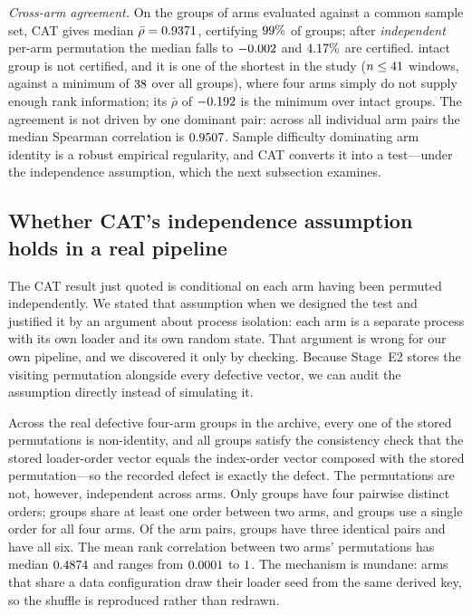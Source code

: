 \documentclass[a4paper,fleqn]{cas-sc}
\begin{document}
\emph{Cross-arm agreement.} On the \NumCatBlocks{} groups of arms evaluated against
a common sample set, CAT gives median $\bar{\rho} = 0.9371{}$,
certifying $99\%$ of groups; after \emph{independent} per-arm
permutation
the median falls to $-0.002{}$ and $4.17\%$ are
certified. \NumCatMissGroups{} intact group is not certified, and it is one of the
shortest in the study ($n \le 41{}$ windows, against a minimum of
$38{}$ over all groups), where four arms simply do not supply enough rank
information; its $\bar{\rho}$ of $-0.192{}$ is the minimum over intact
groups. The agreement is not driven by one dominant pair: across all \NumCatPairs{}
individual arm pairs the median Spearman correlation is $0.9507{}$.
Sample difficulty dominating arm identity is a robust empirical regularity, and CAT
converts it into a test---under the independence assumption, which the next
subsection examines.

\subsection{Whether CAT's independence assumption holds in a real pipeline}
\label{sec:res-observed}

The CAT result just quoted is conditional on each arm having been permuted
independently. We stated that assumption when we designed the test and justified
it by an argument about process isolation: each arm is a separate process with its
own loader and its own random state. That argument is wrong for our own pipeline,
and we discovered it only by checking. Because Stage~E2 stores the visiting
permutation alongside every defective vector, we can audit the assumption directly
instead of simulating it.

Across the \NumObsPermGroups{} real defective four-arm groups in the archive, every
one of the \NumObsPermArms{} stored permutations is non-identity, and all
\NumObsPermConsistentGroups{} groups satisfy the consistency check that the stored
loader-order vector equals the index-order vector composed with the stored
permutation---so the recorded defect is exactly the defect. The permutations are
not, however, independent across arms. Only \NumObsPermAllDistinct{} groups have
four pairwise distinct orders; \NumObsPermPartialShared{} groups share at least one
order between two arms, and \NumObsPermAllIdentical{} groups use a single order for
all four arms. Of the \NumObsPermPairs{} arm pairs, \NumObsPairsIdenticalThree{}
groups have three identical pairs and \NumObsPairsIdenticalSix{} have all six. The
mean rank correlation between two arms' permutations has median
$0.4874{}$ and ranges from $0.0001{}$ to
$1{}$. The mechanism is mundane: arms that share a data
configuration draw their loader seed from the same derived key, so the shuffle is
reproduced rather than redrawn.
\end{document}

